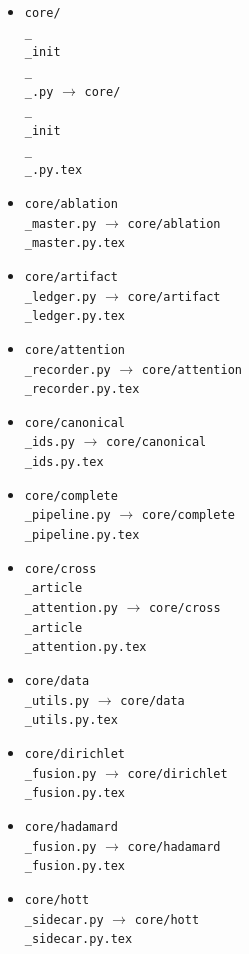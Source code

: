 \documentclass[11pt]{article}
\begin{document}
\begin{itemize}
\item \texttt{core/\\_\\_init\\_\\_.py} $\rightarrow$ \texttt{core/\\_\\_init\\_\\_.py.tex}
\item \texttt{core/ablation\\_master.py} $\rightarrow$ \texttt{core/ablation\\_master.py.tex}
\item \texttt{core/artifact\\_ledger.py} $\rightarrow$ \texttt{core/artifact\\_ledger.py.tex}
\item \texttt{core/attention\\_recorder.py} $\rightarrow$ \texttt{core/attention\\_recorder.py.tex}
\item \texttt{core/canonical\\_ids.py} $\rightarrow$ \texttt{core/canonical\\_ids.py.tex}
\item \texttt{core/complete\\_pipeline.py} $\rightarrow$ \texttt{core/complete\\_pipeline.py.tex}
\item \texttt{core/cross\\_article\\_attention.py} $\rightarrow$ \texttt{core/cross\\_article\\_attention.py.tex}
\item \texttt{core/data\\_utils.py} $\rightarrow$ \texttt{core/data\\_utils.py.tex}
\item \texttt{core/dirichlet\\_fusion.py} $\rightarrow$ \texttt{core/dirichlet\\_fusion.py.tex}
\item \texttt{core/hadamard\\_fusion.py} $\rightarrow$ \texttt{core/hadamard\\_fusion.py.tex}
\item \texttt{core/hott\\_sidecar.py} $\rightarrow$ \texttt{core/hott\\_sidecar.py.tex}

\end{itemize}
\end{document}
